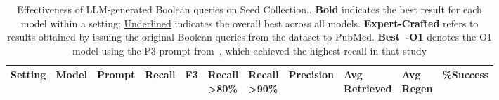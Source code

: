 \begin{table}[t]
	\centering
	\footnotesize
	\caption{Effectiveness of LLM-generated Boolean queries on Seed Collection.. \textbf{Bold} indicates the best result for each model within a setting; \underline{Underlined} indicates the overall best across all models. \textbf{Expert-Crafted} refers to results obtained by issuing the original Boolean queries from the dataset to PubMed. \textbf{Best~\citet{wang2025reassessing}-O1} denotes the O1 model using the P3 prompt from~\citet{wang2025reassessing}, which achieved the highest recall in that study}
	\label{tab:eval-results-seed}
		\begin{tabular*}{\textwidth}{@{\extracolsep{\fill}}lllllllllll@{}}
			\toprule
			\cmidrule(lr){4-7} \cmidrule(lr){8-11}
			Setting & Model & Prompt & Recall & F3 & \parbox{2.5em}{Recall\\>80\%} & \parbox{2.5em}{Recall\\>90\%} & Precision & \parbox{4em}{Avg\\Retrieved} & \parbox{2.5em}{Avg\\Regen} & \%Success \\
			\midrule
			

\end{tabular*}
\end{table}
